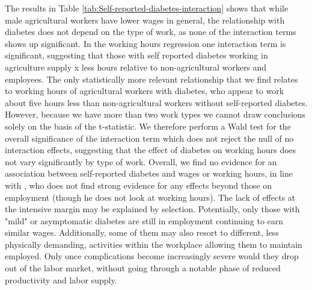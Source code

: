 \documentclass[12pt,english,british]{article}
\begin{document}
The results in Table \ref{tab:Self-reported-diabetes-interaction} shows that while male
agricultural workers have lower wages in general, the relationship
with diabetes does not depend on the type of work, as none of the interaction terms shows up significant. In the working hours regression one interaction term is significant, suggesting that those with self reported diabetes working in agriculture supply x less hours relative to non-agricultural workers and employees. The only
statistically more relevant relationship that we find relates to working
hours of agricultural workers with diabetes, who appear to work about
five hours less than non-agricultural workers without self-reported diabetes.
However, because we have more than two work types we cannot draw conclusions
solely on the basis of the t-statistic. We therefore perform a Wald
test for the overall significance of the interaction term which does
not reject the null of no interaction effects, suggesting that the
effect of diabetes on working hours does not vary significantly by type of work.  Overall, we find no evidence for an association between self-reported diabetes and wages or working hours, in line with \citet{Minor2013}, who does not find strong evidence for any effects beyond those on employment (though he does not look at working hours). The lack of effects at the intensive margin may be explained by selection. Potentially, only those with "mild" or asymptomatic diabetes are still in employment continuing to earn similar wages. Additionally, some of them may also resort to different, less physically demanding, activities within the workplace allowing them to maintain employed. Only once complications become increasingly severe would they drop out of the labor market, without going through a notable phase of reduced productivity and labor supply. 
\end{document}

